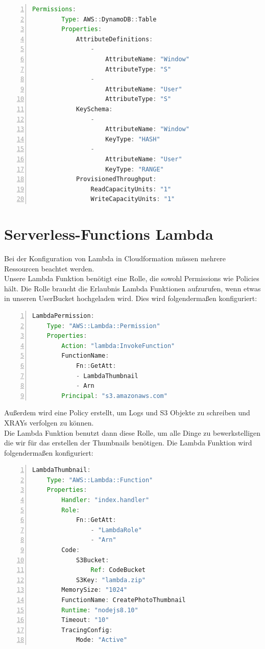 \documentclass[a4paper, 12pt]{scrreprt}
\renewcommand\_{\textunderscore\allowbreak}
\begin{document}
\begin{lstlisting}[xleftmargin=\parindent,numbers=left,numberstyle=\small,numbersep=8pt,frame=L,mathescape=true, basicstyle=\small, language=Java, lineskip={1.0pt}]
Permissions:
        Type: AWS::DynamoDB::Table
        Properties:
            AttributeDefinitions:
                -
                    AttributeName: "Window"
                    AttributeType: "S"
                -
                    AttributeName: "User"
                    AttributeType: "S"
            KeySchema:
                -
                    AttributeName: "Window"
                    KeyType: "HASH"
                -
                    AttributeName: "User"
                    KeyType: "RANGE"
            ProvisionedThroughput:
                ReadCapacityUnits: "1"
                WriteCapacityUnits: "1"
\end{lstlisting}



\section{Serverless-Functions Lambda}
Bei der Konfiguration von Lambda in Cloudformation müssen mehrere Ressourcen beachtet werden. \\
Unsere Lambda Funktion benötigt eine Rolle, die sowohl Permissions wie Policies hält. Die Rolle braucht die Erlaubnis Lambda Funktionen aufzurufen, wenn etwas in unseren UserBucket hochgeladen wird. Dies wird folgendermaßen konfiguriert:

\begin{lstlisting}[xleftmargin=\parindent,numbers=left,numberstyle=\small,numbersep=8pt,frame=L,mathescape=true, basicstyle=\small, language=Java, lineskip={1.0pt}]
LambdaPermission:
    Type: "AWS::Lambda::Permission"
    Properties: 
        Action: "lambda:InvokeFunction"
        FunctionName:
            Fn::GetAtt:
            - LambdaThumbnail
            - Arn
        Principal: "s3.amazonaws.com"
\end{lstlisting}

Außerdem wird eine Policy erstellt, um Logs und S3 Objekte zu schreiben und XRAYs verfolgen zu können.\\
Die Lambda Funktion benutzt dann diese Rolle, um alle Dinge zu bewerkstelligen die wir für das erstellen der Thumbnails benötigen. Die Lambda Funktion wird folgendermaßen konfiguriert:

\begin{lstlisting}[xleftmargin=\parindent,numbers=left,numberstyle=\small,numbersep=8pt,frame=L,mathescape=true, basicstyle=\small, language=Java, lineskip={1.0pt}]
LambdaThumbnail:
    Type: "AWS::Lambda::Function"
    Properties: 
        Handler: "index.handler"
        Role: 
            Fn::GetAtt: 
                - "LambdaRole"
                - "Arn"
        Code:
            S3Bucket:
                Ref: CodeBucket
            S3Key: "lambda.zip"
        MemorySize: "1024"
        FunctionName: CreatePhotoThumbnail
        Runtime: "nodejs8.10"
        Timeout: "10"
        TracingConfig:
            Mode: "Active"
\end{lstlisting}
\end{document}
